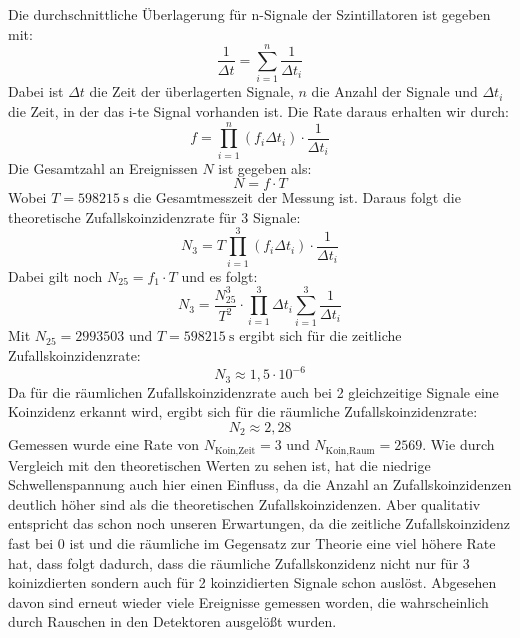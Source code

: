\documentclass{article}
\begin{document}
Die durchschnittliche Überlagerung für n-Signale der Szintillatoren ist gegeben mit:
\begin{displaymath}
    \frac{1}{\Delta t}= \sum_{i=1}^{n} \frac{1}{\Delta t_i}
\end{displaymath}
Dabei ist $\Delta t$ die Zeit der überlagerten Signale, $n$ die Anzahl der Signale und $\Delta t_i$ die Zeit, in der das i-te Signal vorhanden ist.
Die Rate daraus erhalten wir durch:
\begin{displaymath}
    f=\prod_{i=1}^{n} (f_i \Delta t_i) \cdot \frac{1}{\Delta t_i}
\end{displaymath}
Die Gesamtzahl an Ereignissen $N$ ist gegeben als:
\begin{displaymath}
    N = f \cdot T
\end{displaymath}
Wobei $T=\SI{598215}{\second}$ die Gesamtmesszeit der Messung ist.
Daraus folgt die theoretische Zufallskoinzidenzrate für 3 Signale:
\begin{displaymath}
    N_3=T\prod_{i=1}^{3} (f_i \Delta t_i) \cdot \frac{1}{\Delta t_i}
\end{displaymath}
Dabei gilt noch $N_{25}=f_1 \cdot T$ und es folgt:
\begin{displaymath}
    N_3 = \frac{N_{25}^3}{T^2} \cdot \prod_{i=1}^{3} \Delta t_i \sum_{i=1}^{3}\frac{1}{\Delta t_i}
\end{displaymath}
Mit $N_{25}=2993503$ und $T=\SI{598215}{\second}$ ergibt sich für die zeitliche Zufallskoinzidenzrate:
\begin{displaymath}
    N_3 \approx 1,5 \cdot 10^{-6}    
\end{displaymath}
Da für die räumlichen Zufallskoinzidenzrate auch bei 2 gleichzeitige Signale eine Koinzidenz erkannt wird, ergibt sich für die räumliche Zufallskoinzidenzrate:
\begin{displaymath}
    N_2 \approx 2,28
\end{displaymath}
Gemessen wurde eine Rate von $N_\text{Koin,Zeit}=3$ und $N_\text{Koin,Raum}=2569$.
Wie durch Vergleich mit den theoretischen Werten zu sehen ist, hat die niedrige Schwellenspannung auch hier einen Einfluss, da die Anzahl an Zufallskoinzidenzen deutlich höher sind als die theoretischen Zufallskoinzidenzen.
Aber qualitativ entspricht das schon noch unseren Erwartungen, da die zeitliche Zufallskoinzidenz fast bei 0 ist und die räumliche im Gegensatz zur Theorie eine viel höhere Rate hat, dass folgt dadurch, dass
die räumliche Zufallskonzidenz nicht nur für 3 koinizdierten sondern auch für 2 koinzidierten Signale schon auslöst. Abgesehen davon sind erneut wieder viele Ereignisse gemessen worden,
die wahrscheinlich durch Rauschen in den Detektoren ausgelößt wurden.
\end{document}
